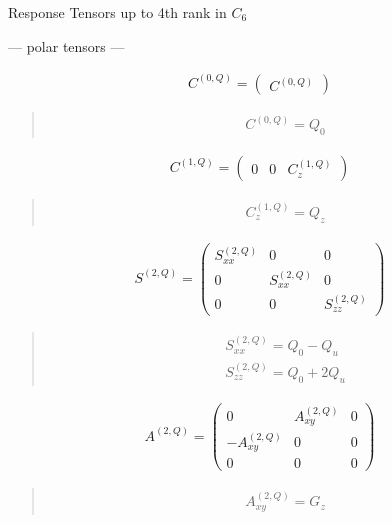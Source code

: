 \documentclass[fleqn,10pt]{jsarticle}
\begin{document}
\setcounter{MaxMatrixCols}{16}

\begin{center}
\LARGE
Response Tensors up to 4th rank in $C_{6}$
\end{center}
\begin{center}\LARGE --- polar tensors ---\end{center}
\begin{align*}
C^{(0,Q)} = \begin{pmatrix} C^{(0,Q)} \end{pmatrix}
\end{align*}
\begin{quote}
\begin{align*}
& C^{(0,Q)} = Q_{0}
\end{align*}
\end{quote}
\begin{align*}
C^{(1,Q)} = \begin{pmatrix} 0 & 0 & C^{(1,Q)}_{z} \end{pmatrix}
\end{align*}
\begin{quote}
\begin{align*}
& C^{(1,Q)}_{z} = Q_{z}
\end{align*}
\end{quote}
\begin{align*}
S^{(2,Q)} = \begin{pmatrix} S^{(2,Q)}_{xx} & 0 & 0 \\ 0 & S^{(2,Q)}_{xx} & 0 \\ 0 & 0 & S^{(2,Q)}_{zz} \end{pmatrix}
\end{align*}
\begin{quote}
\begin{align*}
& S^{(2,Q)}_{xx} = Q_{0} - Q_{u} \\
& S^{(2,Q)}_{zz} = Q_{0} + 2 Q_{u}
\end{align*}
\end{quote}
\begin{align*}
A^{(2,Q)} = \begin{pmatrix} 0 & A^{(2,Q)}_{xy} & 0 \\ - A^{(2,Q)}_{xy} & 0 & 0 \\ 0 & 0 & 0 \end{pmatrix}
\end{align*}
\begin{quote}
\begin{align*}
& A^{(2,Q)}_{xy} = G_{z}
\end{align*}
\end{quote}
\end{document}
